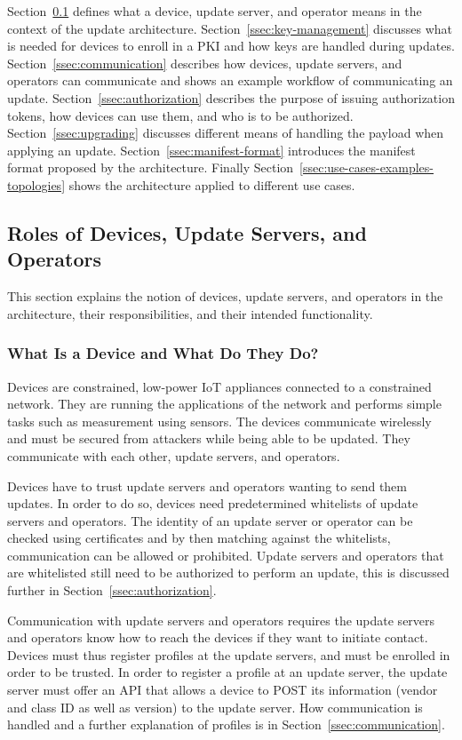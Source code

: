 \documentclass[0-thesis.tex]{subfiles}
\begin{document}
Section~\ref{ssec:roles} defines what a device, update server, and operator means in the
context of the update architecture. Section~\ref{ssec:key-management} discusses what is
needed for devices to enroll in a PKI and how keys are handled during updates.
Section~\ref{ssec:communication} describes how devices, update servers, and operators can
communicate and shows an example workflow of communicating an update.
Section~\ref{ssec:authorization} describes the purpose of issuing authorization tokens,
how devices can use them, and who is to be authorized. Section~\ref{ssec:upgrading}
discusses different means of handling the payload when applying an update.
Section~\ref{ssec:manifest-format} introduces the manifest format proposed by the
architecture. Finally Section~\ref{ssec:use-cases-examples-topologies} shows the
architecture applied to different use cases.

\subsection{Roles of Devices, Update Servers, and Operators}
\label{ssec:roles}
This section explains the notion of devices, update servers, and operators in the
architecture, their responsibilities, and their intended functionality.

\subsubsection{What Is a Device and What Do They Do?}
\label{sssec:what-is-a-device}
Devices are constrained, low-power IoT appliances connected to a constrained network. They
are running the applications of the network and performs simple tasks such as measurement
using sensors. The devices communicate wirelessly and must be secured from attackers while
being able to be updated. They communicate with each other, update servers, and operators.

Devices have to trust update servers and operators wanting to send them updates. In order
to do so, devices need predetermined whitelists of update servers and operators. The
identity of an update server or operator can be checked using certificates and by then
matching against the whitelists, communication can be allowed or prohibited. Update
servers and operators that are whitelisted still need to be authorized to perform an
update, this is discussed further in Section~\ref{ssec:authorization}.

Communication with update servers and operators requires the update servers and operators
know how to reach the devices if they want to initiate contact. Devices must thus register
profiles at the update servers, and must be enrolled in order to be trusted. In order to
register a profile at an update server, the update server must offer an API that allows a
device to POST its information (vendor and class ID as well as version) to the update
server. How communication is handled and a further explanation of profiles is in
Section~\ref{ssec:communication}.
\end{document}

